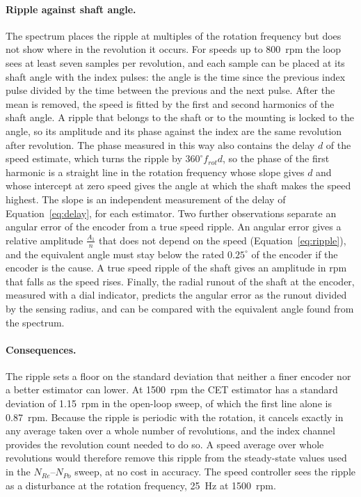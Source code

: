 \paragraph{Ripple against shaft angle.}
The spectrum places the ripple at multiples of the rotation frequency but does not show where in the revolution it occurs. For speeds up to 800~rpm the loop sees at least seven samples per revolution, and each sample can be placed at its shaft angle with the index pulses: the angle is the time since the previous index pulse divided by the time between the previous and the next pulse. After the mean is removed, the speed is fitted by the first and second harmonics of the shaft angle. A ripple that belongs to the shaft or to the mounting is locked to the angle, so its amplitude and its phase against the index are the same revolution after revolution. The phase measured in this way also contains the delay $d$ of the speed estimate, which turns the ripple by $360^{\circ} f_{rot} d$, so the phase of the first harmonic is a straight line in the rotation frequency whose slope gives $d$ and whose intercept at zero speed gives the angle at which the shaft makes the speed highest. The slope is an independent measurement of the delay of Equation~\ref{eq:delay}, for each estimator. Two further observations separate an angular error of the encoder from a true speed ripple. An angular error gives a relative amplitude $\frac{A_1}{n}$ that does not depend on the speed (Equation~\ref{eq:ripple}), and the equivalent angle must stay below the rated $0.25^{\circ}$ of the encoder if the encoder is the cause. A true speed ripple of the shaft gives an amplitude in rpm that falls as the speed rises. Finally, the radial runout of the shaft at the encoder, measured with a dial indicator, predicts the angular error as the runout divided by the sensing radius, and can be compared with the equivalent angle found from the spectrum.


\paragraph{Consequences.}
The ripple sets a floor on the standard deviation that neither a finer encoder nor a better estimator can lower. At 1500~rpm the CET estimator has a standard deviation of 1.15~rpm in the open-loop sweep, of which the first line alone is 0.87~rpm. Because the ripple is periodic with the rotation, it cancels exactly in any average taken over a whole number of revolutions, and the index channel provides the revolution count needed to do so. A speed average over whole revolutions would therefore remove this ripple from the steady-state values used in the $N_{Re}$--$N_{Po}$ sweep, at no cost in accuracy. The speed controller sees the ripple as a disturbance at the rotation frequency, 25~Hz at 1500~rpm.

